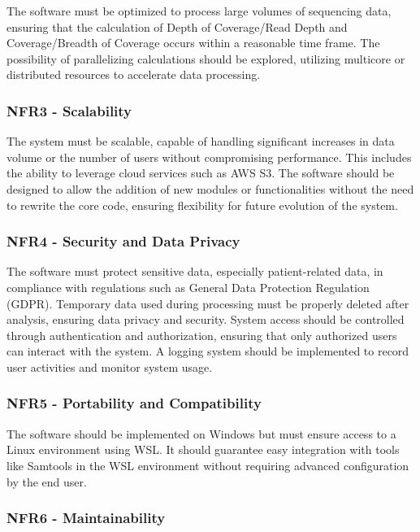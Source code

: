 The software must be optimized to process large volumes of sequencing data, ensuring that the calculation of Depth of Coverage/Read Depth and Coverage/Breadth of Coverage occurs within a reasonable time frame. The possibility of parallelizing calculations should be explored, utilizing multicore or distributed resources to accelerate data processing.

\subsubsection{\textbf{NFR3 - Scalability}}

The system must be scalable, capable of handling significant increases in data volume or the number of users without compromising performance. This includes the ability to leverage cloud services such as AWS S3. The software should be designed to allow the addition of new modules or functionalities without the need to rewrite the core code, ensuring flexibility for future evolution of the system.

\subsubsection{\textbf{NFR4 - Security and Data Privacy}}

The software must protect sensitive data, especially patient-related data, in compliance with regulations such as General Data Protection Regulation (GDPR). Temporary data used during processing must be properly deleted after analysis, ensuring data privacy and security. System access should be controlled through authentication and authorization, ensuring that only authorized users can interact with the system. A logging system should be implemented to record user activities and monitor system usage.

\subsubsection{\textbf{NFR5 - Portability and Compatibility}}

The software should be implemented on Windows but must ensure access to a Linux environment using WSL. It should guarantee easy integration with tools like Samtools in the WSL environment without requiring advanced configuration by the end user.

\subsubsection{\textbf{NFR6 - Maintainability}}

